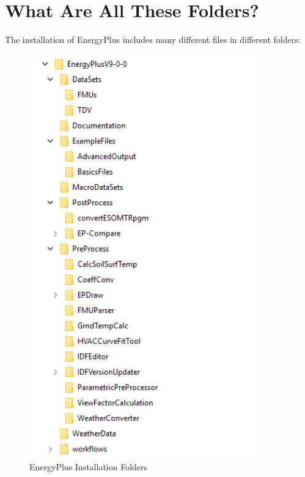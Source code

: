 \section{What Are All These Folders?}

The installation of EnergyPlus includes many different files in different
folders:

\begin{figure}[hbtp]
\centering
\includegraphics[width=0.9\textwidth, height=0.9\textheight, keepaspectratio=true]{media/energyplusfolder.png}
\caption{EnergyPlus Installation Folders}
\end{figure}

